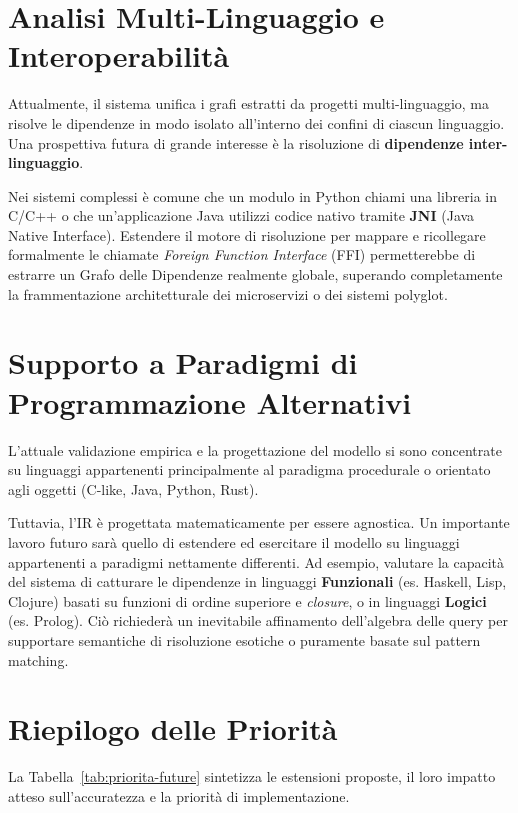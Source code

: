 \section{Analisi Multi-Linguaggio e Interoperabilità}
Attualmente, il sistema unifica i grafi estratti da progetti multi-linguaggio,
ma risolve le dipendenze in modo isolato all'interno dei confini di ciascun
linguaggio. Una prospettiva futura di grande interesse è la risoluzione di
\textbf{dipendenze inter-linguaggio}.

Nei sistemi complessi è comune che un modulo in Python chiami una libreria in
C/C++ o che un'applicazione Java utilizzi codice nativo tramite \textbf{JNI}
(Java Native Interface). Estendere il motore di risoluzione per mappare
e ricollegare formalmente le chiamate \textit{Foreign Function Interface} (FFI)
permetterebbe di estrarre un Grafo delle Dipendenze realmente globale,
superando completamente la frammentazione architetturale dei microservizi
o dei sistemi polyglot.

\section{Supporto a Paradigmi di Programmazione Alternativi}
L'attuale validazione empirica e la progettazione del modello si sono
concentrate su linguaggi appartenenti principalmente al paradigma
procedurale o orientato agli oggetti (C-like, Java, Python, Rust).

Tuttavia, l'IR è progettata matematicamente per essere agnostica. Un
importante lavoro futuro sarà quello di estendere ed esercitare il modello
su linguaggi appartenenti a paradigmi nettamente differenti. Ad esempio,
valutare la capacità del sistema di catturare le dipendenze in linguaggi
\textbf{Funzionali} (es. Haskell, Lisp, Clojure) basati su funzioni di
ordine superiore e \textit{closure}, o in linguaggi \textbf{Logici}
(es. Prolog). Ciò richiederà un inevitabile affinamento dell'algebra
delle query per supportare semantiche di risoluzione esotiche o puramente
basate sul pattern matching.

\section{Riepilogo delle Priorità}
La Tabella~\ref{tab:priorita-future} sintetizza le estensioni
proposte, il loro impatto atteso sull'accuratezza e la priorità di
implementazione.


